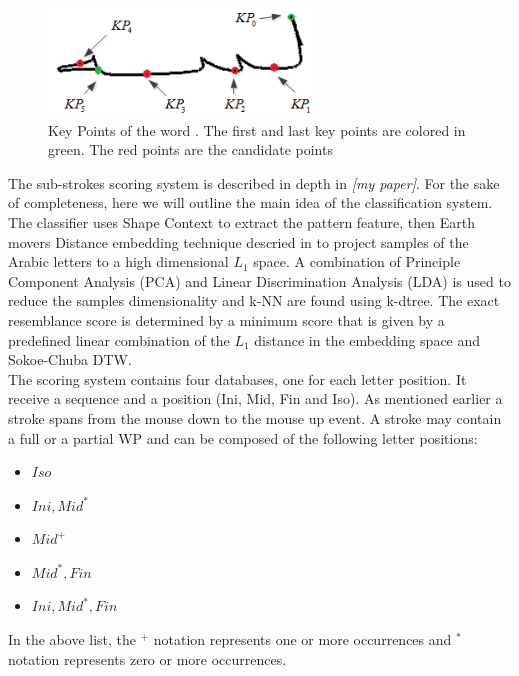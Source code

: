 \documentclass[journal,compsoc]{IEEEtran}
\begin{document}
\begin{figure}
\centering
\includegraphics[width=7cm]{./figures/candidate_points}
\caption{Key Points of the word  . The first and last key points are colored in green. The red points are the candidate points}
\label{fig:candidate_points}
\end{figure}

The sub-strokes scoring system is described in depth in \emph{[my paper]}. For the sake of completeness, here we will outline the main idea of the classification system. The classifier uses Shape Context to extract the pattern feature, then Earth movers Distance embedding technique descried in \cite{shirdhonkar2008approximate} to project samples of the Arabic letters to a high dimensional $L_{1}$ space. A combination of Principle Component Analysis (PCA) and Linear Discrimination Analysis (LDA) is used to reduce the samples dimensionality and k-NN are found using k-dtree. The exact resemblance score is determined by a minimum score that is given by a predefined linear combination of the $L_{1}$ distance in the embedding space and Sokoe-Chuba DTW.\\

The scoring system contains four databases, one for each letter position. It receive a sequence and a position (Ini, Mid, Fin and Iso).
As mentioned earlier a stroke spans from the mouse down to the mouse up event. 
A stroke may contain a full or a partial WP and can be composed of the following letter positions: 
\begin{multicols}{2}
\begin{itemize}
    \item $Iso$
    \item $Ini,Mid^{*}$
    \item $Mid^{+}$    
    \item $Mid^{*},Fin$
    \item $Ini,Mid^{*},Fin$
\end{itemize}
\end{multicols}
In the above list, the $^{+}$ notation represents one or more occurrences and $^{*}$ notation represents zero or more occurrences.
\end{document}
